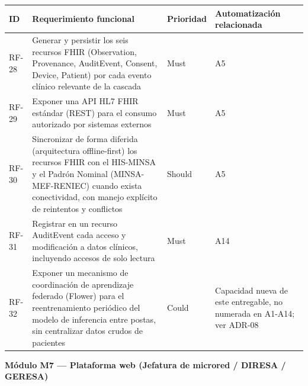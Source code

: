 \documentclass[11pt,a4paper]{article}
\begin{document}
{\small
\begin{longtable}[]{@{}
  >{\raggedright\arraybackslash}p{}
  >{\raggedright\arraybackslash}p{}
  >{\raggedright\arraybackslash}p{}
  >{\raggedright\arraybackslash}p{}@{}}
\toprule\noalign{}
\begin{minipage}[b]{\linewidth}\raggedright
ID
\end{minipage} & \begin{minipage}[b]{\linewidth}\raggedright
Requerimiento funcional
\end{minipage} & \begin{minipage}[b]{\linewidth}\raggedright
Prioridad
\end{minipage} & \begin{minipage}[b]{\linewidth}\raggedright
Automatización relacionada
\end{minipage} \\
\midrule\noalign{}
\endhead
\bottomrule\noalign{}
\endlastfoot
RF-28 & Generar y persistir los seis recursos FHIR (Observation, Provenance, AuditEvent, Consent, Device, Patient) por cada evento clínico relevante de la cascada & Must & A5 \\
RF-29 & Exponer una API HL7 FHIR estándar (REST) para el consumo autorizado por sistemas externos & Must & A5 \\
RF-30 & Sincronizar de forma diferida (arquitectura offline-first) los recursos FHIR con el HIS-MINSA y el Padrón Nominal (MINSA-MEF-RENIEC) cuando exista conectividad, con manejo explícito de reintentos y conflictos & Should & A5 \\
RF-31 & Registrar en un recurso AuditEvent cada acceso y modificación a datos clínicos, incluyendo accesos de solo lectura & Must & A14 \\
RF-32 & Exponer un mecanismo de coordinación de aprendizaje federado (Flower) para el reentrenamiento periódico del modelo de inferencia entre postas, sin centralizar datos crudos de pacientes & Could & Capacidad nueva de este entregable, no numerada en A1-A14; ver ADR-08 \\
\end{longtable}
}

\textbf{Módulo M7 --- Plataforma web (Jefatura de microred / DIRESA / GERESA)}
\end{document}
